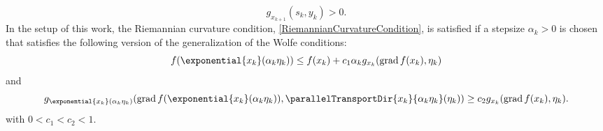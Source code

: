 \begin{equation}\label{RiemannianCurvatureCondition}
    g_{x_{k+1}}(s_k,y_k) > 0.
\end{equation}
In the setup of this work, the Riemannian curvature condition, \cref{RiemannianCurvatureCondition}, is satisfied if a stepsize $\alpha_k > 0$ is chosen that satisfies the following version of the generalization of the Wolfe conditions:
\begin{equation}\label{RiemannianWolfeConditions1}
    f( \exponential{x_k}(\alpha_k \eta_k)) \leq f(x_k) + c_1 \alpha_k g_{x_k} (\operatorname{grad} f(x_k), \eta_k)
\end{equation}
and 
\begin{equation}\label{RiemannianWolfeConditions2.2}
    g_{\exponential{x_k}(\alpha_k \eta_k)} (\operatorname{grad} f(\exponential{x_k}(\alpha_k \eta_k)), \parallelTransportDir{x_k}{\alpha_k \eta_k}(\eta_k)) \geq c_2 g_{x_k} (\operatorname{grad} f(x_k), \eta_k).
\end{equation}
with $0 < c_1 < c_2 < 1$.

